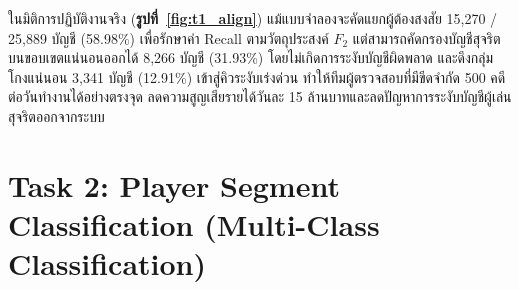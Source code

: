 \documentclass[11pt,a4paper]{article}
\begin{document}
ในมิติการปฏิบัติงานจริง (\textbf{รูปที่~\ref{fig:t1_align}}) แม้แบบจำลองจะคัดแยกผู้ต้องสงสัย 15,270 / 25,889 บัญชี (58.98\%) เพื่อรักษาค่า Recall ตามวัตถุประสงค์ $F_2$ แต่สามารถคัดกรองบัญชีสุจริตบนขอบเขตแน่นอนออกได้ 8,266 บัญชี (31.93\%) โดยไม่เกิดการระงับบัญชีผิดพลาด และดึงกลุ่มโกงแน่นอน 3,341 บัญชี (12.91\%) เข้าสู่คิวระงับเร่งด่วน ทำให้ทีมผู้ตรวจสอบที่มีขีดจำกัด 500 คดีต่อวันทำงานได้อย่างตรงจุด ลดความสูญเสียรายได้วันละ 15 ล้านบาทและลดปัญหาการระงับบัญชีผู้เล่นสุจริตออกจากระบบ

\clearpage
\section{Task 2: Player Segment Classification (Multi-Class Classification)}
\end{document}
